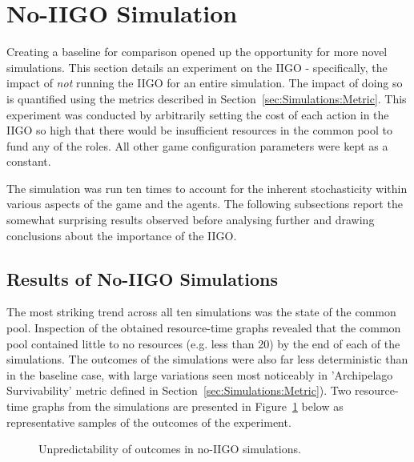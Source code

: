 \section{No-IIGO Simulation}
\label{sec:ResultsAndEval:no-iigo}

Creating a baseline for comparison opened up the opportunity for more novel simulations. This section details an experiment on the IIGO - specifically, the impact of \emph{not} running the IIGO for an entire simulation. The impact of doing so is quantified using the metrics described in Section~\ref{sec:Simulations:Metric}.
This experiment was conducted by arbitrarily setting the cost of each action in the IIGO so high that there would be insufficient resources in the common pool to fund any of the roles. All other game configuration parameters were kept as a constant. 

The simulation was run ten times to account for the inherent stochasticity within various aspects of the game and the agents. The following subsections report the somewhat surprising results observed before analysing further and drawing conclusions about the importance of the IIGO.

\subsection{Results of No-IIGO Simulations}
\label{subsec:ResultsAndEval:no-iigo:results}

The most striking trend across all ten simulations was the state of the common pool. Inspection of the obtained resource-time graphs revealed that the common pool contained little to no resources (e.g. less than 20) by the end of each of the simulations. The outcomes of the simulations were also far less deterministic than in the baseline case, with large variations seen most noticeably in 'Archipelago Survivability' metric defined in Section~\ref{sec:Simulations:Metric}).
Two resource-time graphs from the simulations are presented in Figure~\ref{fig:ResultsAndEval:no_iigo_unpredictable} below as representative samples of the outcomes of the experiment.


\begin{figure}[h]
    \centering
    \caption{Unpredictability of outcomes in no-IIGO simulations.}
    \label{fig:ResultsAndEval:no_iigo_unpredictable}
\end{figure}

